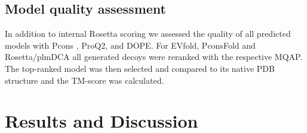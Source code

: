 \documentclass{bioinfo}
\begin{document}
\begin{methods}
\subsection{Model quality assessment}
In addition to internal Rosetta scoring we assessed the quality of all predicted models with Pcons \cite{lundstrom_pcons:_2001}, ProQ2, and DOPE. For EVfold, PconsFold and Rosetta/plmDCA all generated decoys were reranked with the respective MQAP. The top-ranked model was then selected and compared to its native PDB structure and the TM-score was calculated. 




\end{methods}

\section{Results and Discussion}
\end{document}
